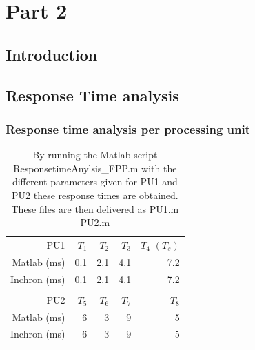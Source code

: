\chapter{Part 2}


\section{Introduction}

\section{Response Time analysis}

\subsection{Response time analysis per processing unit}

\begin{table}[htbp]
	\centering
	\caption{By running the Matlab script ResponsetimeAnylsis\_FPP.m with the different parameters given for PU1 and PU2 these response times are obtained. These files are then delivered as PU1.m PU2.m}
	\begin{tabular}{rrrrr}
		& & & & \\
		\toprule
		PU1     & $T_1$    & $T_2$    & $T_3$    & $T_4$  $(T_s)$ \\
		\midrule
		Matlab (ms)      & 0.1     & 2.1     & 4.1     & 7.2 \\
		Inchron (ms)	& 0.1     & 2.1     & 4.1     & 7.2 \\
		
		& & & & \\
		\toprule
		PU2     & $T_5$    & $T_6$    & $T_7$    & $T_8$ \\
		\midrule
		Matlab (ms)      & 6       & 3       & 9       & 5 \\
		Inchron (ms)	 & 6       & 3       & 9       & 5 \\
		
	\end{tabular}%
	\label{tab:addlabel}%
\end{table}%


